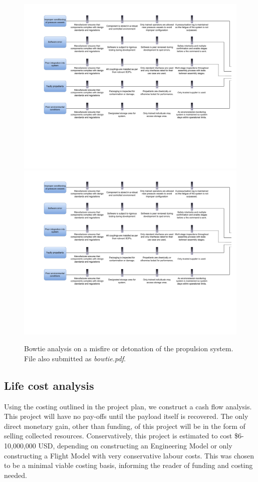 \documentclass[conference]{IEEEtran}
\begin{document}
\begin{figure}[H]
\centering
\includegraphics[page=2, angle=90, width=\linewidth]{bowtie.pdf}
\includegraphics[page=1, angle=90, width=\linewidth]{bowtie.pdf}

\caption{\label{fig:bowtie}Bowtie analysis on a misfire or detonation of the propulsion system. File also submitted as \textit{bowtie.pdf}.}
\end{figure}

\subsection{Life cost analysis}
Using the costing outlined in the project plan, we construct a cash flow analysis. This project will have no pay-offs until the payload itself is recovered. The only direct monetary gain, other than funding, of this project will be in the form of selling collected resources. Conservatively, this project is estimated to cost \$6-10,000,000 USD, depending on constructing an Engineering Model or only constructing a Flight Model with very conservative labour costs. This was chosen to be a minimal viable costing basis, informing the reader of funding and costing needed.
\end{document}
